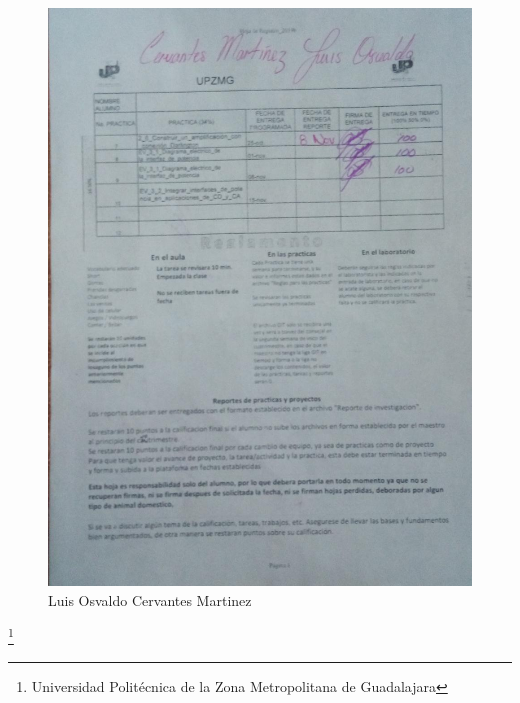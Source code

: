 \documentclass[10pt,a4paper]{article}
\begin{document}
\newpage
\begin{figure}[hbtp]
\centering
\includegraphics[scale=0.42]{Pictures/OSVALDO.png}
\caption{Luis Osvaldo Cervantes Martinez }
\end{figure}
\footnote{Universidad Politécnica de la Zona Metropolitana de Guadalajara}
\end{document}
